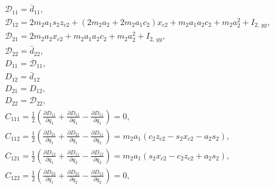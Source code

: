 \begin{align}
    & \mathcal{D}_{11} = \bar{d}_{11},
    \\
    & \mathcal{D}_{12} = 2 m_2 a_1 s_2  z_{c2} + (2 m_2 a_2 + 2 m_2 a_1 c_2) x_{c2} + m_2 a_1 a_2 c_2 + m_2 a_2^2 + I_{2,\,yy},
    \\
    & \mathcal{D}_{21} = 2 m_2 a_2 x_{c2} + m_2 a_1 a_2 c_2 + m_2 a_2^2 + I_{2,\,yy},
    \\
    & \mathcal{D}_{22} = \bar{d}_{22},
    \\
    & D_{11} = \mathcal{D}_{11},
    \\
    & D_{12} = \bar{d}_{12}
    \\
    & D_{21} = D_{12},
    \\
    & D_{22} = \mathcal{D}_{22},
    \\[0.5cm]
    & C_{111} = \frac{1}{2} \left( \frac{\partial D_{11}}{\partial q_1} + \frac{\partial D_{11}}{\partial q_1} - \frac{\partial D_{11}}{\partial q_1} \right) = 0,
    \\
    & C_{112} = \frac{1}{2} \left( \frac{\partial D_{21}}{\partial q_1} + \frac{\partial D_{21}}{\partial q_1} - \frac{\partial D_{11}}{\partial q_2} \right) = m_2 a_1 (c_2 z_{c2} - s_2 x_{c2} - a_2 s_2),
    \\
    & C_{121} = \frac{1}{2} \left( \frac{\partial D_{12}}{\partial q_1} + \frac{\partial D_{11}}{\partial q_2} - \frac{\partial D_{12}}{\partial q_2} \right) = m_2 a_1 (s_2 x_{c2} - c_2 z_{c2} + a_2 s_2),
    \\
    & C_{122} = \frac{1}{2} \left( \frac{\partial D_{22}}{\partial q_1} + \frac{\partial D_{21}}{\partial q_2} - \frac{\partial D_{12}}{\partial q_2} \right) = 0,
\end{align}
